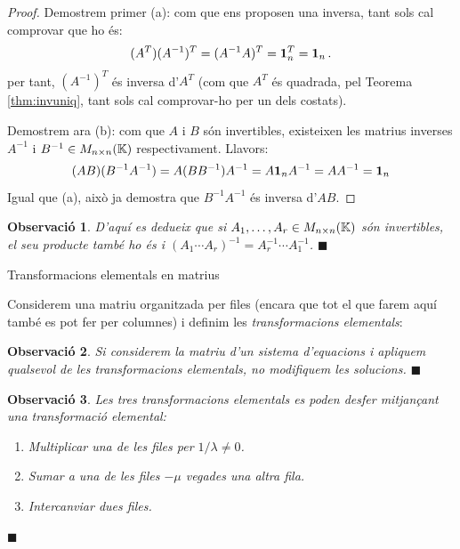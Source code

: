 \documentclass[
  11pt,
]{book}
\makeatletter
\numberwithin{dummy}{section}
\theoremstyle{maincolornumbox}
\newtheorem{remarkT}{Observació}[chapter]
\theoremstyle{blacknumex}
\theoremstyle{blacknumbox}
\theoremstyle{maincolornum}
\newenvironment{remark}{\begin{remarkT}}{\hfill{\tiny\ensuremath{\blacksquare}}\end{remarkT}}
\renewcommand{\section}{\@startsection{section}{1}{\z@}
{-4ex \@plus -1ex \@minus -.4ex}
{1ex \@plus.2ex }
{\normalfont\large\sffamily\bfseries}}
\newlength\esp
\makeatother
\begin{document}
\begin{proof}
Demostrem primer (a): com que ens proposen una inversa, tant
sols cal comprovar que ho és:
\[(A^T)(A^{-1})^T=(A^{-1}A)^T=\mathbf{1}_n^T=\mathbf{1}_n \,.\] per tant, \((A^{-1})^T\)
és inversa d'\(A^T\) (com que \(A^T\) és quadrada, pel Teorema
\ref{thm:invuniq}, tant sols cal comprovar-ho per un dels
costats).

Demostrem ara (b): com que \(A\) i \(B\) són invertibles, existeixen les
matrius inverses \(A^{-1}\) i \(B^{-1}\in M_{n\times n}(\mathbb{K})\)
respectivament. Llavors:
\[(AB)(B^{-1}A^{-1})=A(BB^{-1})A^{-1}=A\mathbf{1}_n A^{-1}=A A^{-1}=\mathbf{1}_n\] Igual
que (a), això ja demostra que \(B^{-1}A^{-1}\) és inversa d'\(AB\).
\end{proof}

\begin{remark}
D'aquí es dedueix que si \(A_1, \dots, A_r \in M_{n\times n}(\mathbb{K})\) són
invertibles, el seu producte també ho és i
\((A_1\cdots A_r)^{-1}=A_r^{-1}\cdots A_1^{-1}\).
\end{remark}

\section{Transformacions elementals en matrius}\label{subsec:trans-el}

Considerem una matriu organitzada per files (encara que tot el que farem
aquí també es pot fer per columnes) i definim les \emph{transformacions
elementals}:

\begin{remark}
Si considerem la matriu d'un sistema d'equacions i apliquem qualsevol de
les transformacions elementals, no modifiquem les solucions.
\end{remark}

\begin{remark}

Les tres transformacions elementals es poden desfer mitjançant una
transformació elemental:

\begin{enumerate}
\def\labelenumi{\arabic{enumi}.}
\item
  Multiplicar una de les files per \(1/\lambda\neq 0\).
\item
  Sumar a una de les files \(-\mu\) vegades una altra fila.
\item
  Intercanviar dues files.
\end{enumerate}

\end{remark}
\end{document}
